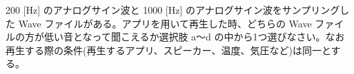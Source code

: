200 [Hz] のアナログサイン波と 1000 [Hz] のアナログサイン波をサンプリングした Wave ファイルがある。アプリを用いて再生した時、どちらの Wave ファイルの方が低い音となって聞こえるか選択肢 a〜d の中から1つ選びなさい。なお再生する際の条件(再生するアプリ、スピーカー、温度、気圧など)は同一とする。
